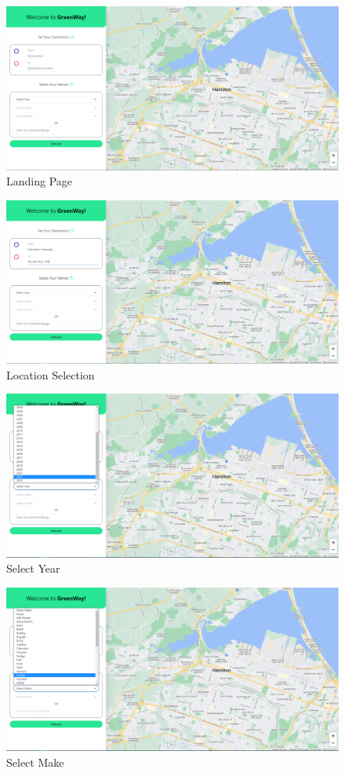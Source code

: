 \documentclass[12pt, titlepage]{article}
\begin{document}
\begin{figure}[h!]
    \centering
    \includegraphics[scale=0.36]{landing-page.PNG}
    \caption{Landing Page}
\end{figure}
\begin{figure}[h!]
    \centering
    \includegraphics[scale=0.36]{location-selection.PNG}
    \caption{Location Selection}
\end{figure}
\begin{figure}[h!]
    \centering
    \includegraphics[scale=0.36]{select-year.PNG}
    \caption{Select Year}
\end{figure}
\begin{figure}[h!]
    \centering
    \includegraphics[scale=0.36]{select-make.PNG}
    \caption{Select Make}
\end{figure}
\end{document}

